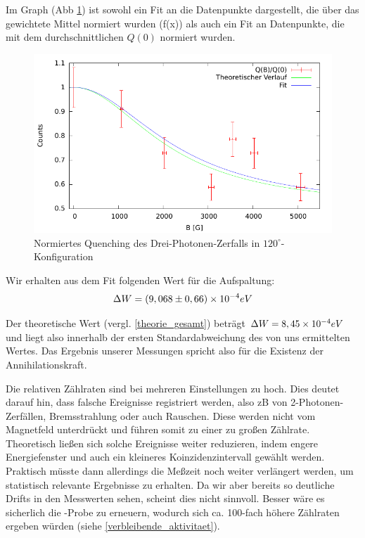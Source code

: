 Im Graph (Abb \ref{auswertung-quench-normiert}) ist sowohl ein Fit an die Datenpunkte dargestellt, die über das gewichtete Mittel normiert wurden (f(x)) als auch ein Fit an Datenpunkte, die mit dem durchschnittlichen $Q(0)$ normiert wurden. 



\begin{figure}[H]
 \includegraphics[width=\textwidth]{Auswertung/quench-normiert.pdf}
 \caption{Normiertes Quenching des Drei-Photonen-Zerfalls in $120^\circ$-Konfiguration}
 \label{auswertung-quench-normiert}
\end{figure}

Wir erhalten aus dem Fit folgenden Wert für die Aufspaltung:
\begin{equation*}
 \Delta W = (9,068 \pm 0,66) \times 10^{-4} eV
\end{equation*}

Der theoretische Wert (vergl. \ref{theorie_gesamt}) beträgt $\Delta W = 8,45\times 10^{-4} eV$ und liegt also innerhalb der ersten Standardabweichung des von uns ermittelten Wertes. Das Ergebnis unserer Messungen spricht also für die Existenz der Annihilationskraft.

Die relativen Zählraten sind bei mehreren Einstellungen zu hoch. Dies deutet darauf hin, dass falsche Ereignisse registriert werden, also zB von 2-Photonen-Zerfällen, Bremsstrahlung oder auch Rauschen. Diese werden nicht vom Magnetfeld unterdrückt und führen somit zu einer zu großen Zählrate. Theoretisch ließen sich solche Ereignisse weiter reduzieren, indem engere Energiefenster und auch ein kleineres Koinzidenzintervall gewählt werden. Praktisch müsste dann allerdings die Meßzeit noch weiter verlängert werden, um statistisch relevante Ergebnisse zu erhalten. Da wir aber bereits so deutliche Drifts in den Messwerten sehen, scheint dies nicht sinnvoll. Besser wäre es sicherlich die \Na-Probe zu erneuern, wodurch sich ca. 100-fach höhere Zählraten ergeben würden (siehe \ref{verbleibende_aktivitaet}).

